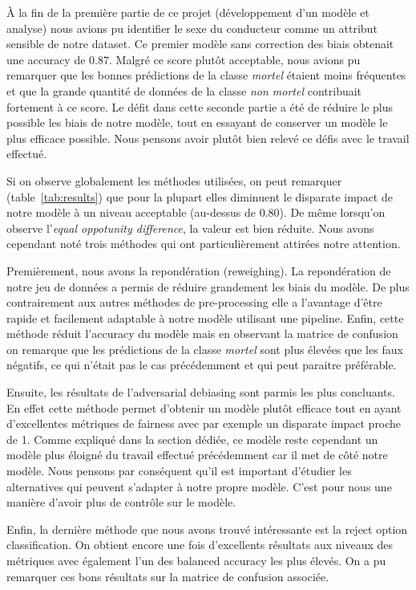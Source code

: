 \documentclass{article}
\begin{document}
    À la fin de la première partie de ce projet (développement d'un modèle et analyse) nous avions pu 
    identifier le sexe du conducteur comme un attribut sensible de notre dataset. Ce premier modèle 
    sans correction des biais obtenait une accuracy de $0.87$. Malgré ce score plutôt acceptable, nous 
    avions pu remarquer que les bonnes prédictions de la classe \textit{mortel} étaient moins fréquentes et 
    que la grande quantité de données de la classe \textit{non mortel} contribuait fortement à ce score. 
    Le défit dans cette seconde partie a été de réduire le plus possible les biais de notre modèle, tout 
    en essayant de conserver un modèle le plus efficace possible. Nous pensons avoir plutôt bien relevé ce 
    défis avec le travail effectué.

    Si on observe globalement les méthodes utilisées, on peut remarquer (table~\ref{tab:results}) que pour la plupart elles 
    diminuent le disparate impact de notre modèle à un niveau acceptable (au-dessus de 0.80). De même lorsqu'on 
    observe l'\textit{equal oppotunity difference}, la valeur est bien réduite. 
    Nous avons cependant noté trois méthodes qui ont particulièrement attirées notre attention.

    Premièrement, nous avons la repondération (reweighing). La repondération de notre jeu de données a 
    permis de réduire grandement les biais du modèle. De plus contrairement aux autres méthodes de 
    pre-processing elle a l'avantage d'être rapide et facilement adaptable à notre modèle utilisant une 
    pipeline. Enfin, cette méthode réduit l'accuracy du modèle mais en observant la matrice de confusion 
    on remarque que les prédictions de la classe \textit{mortel} sont plus élevées que les faux négatifs, 
    ce qui n'était pas le cas précédemment et qui peut paraitre préférable.

    Ensuite, les résultats de l'adversarial debiasing sont parmis les plus concluants. En effet cette 
    méthode permet d'obtenir un modèle plutôt efficace tout en ayant d'excellentes métriques de fairness avec 
    par exemple un disparate impact proche de 1. Comme expliqué dans la section dédiée, ce modèle reste cependant 
    un modèle plus éloigné du travail effectué précédemment car il met de côté notre modèle. Nous pensons par
     conséquent qu'il est important d'étudier les alternatives qui peuvent s'adapter à notre propre modèle.
    C'est pour nous une manière d'avoir plus de contrôle sur le modèle.

    Enfin, la dernière méthode que nous avons trouvé intéressante est la reject option classification. On 
    obtient encore une fois d'excellents résultats aux niveaux des métriques avec également l'un des balanced 
    accuracy les plus élevés. On a pu remarquer ces bons résultats sur la matrice de confusion associée.
\end{document}
